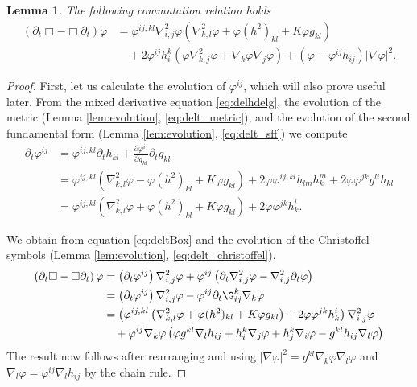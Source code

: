 \documentclass{amsart}
\newtheorem{lemma}[theorem]{Lemma}
\theoremstyle{definition}
\theoremstyle{remark}
\numberwithin{equation}{section}
\begin{document}
\begin{lemma}
\label{lem:deltBox}
The following commutation relation holds
\[
\begin{split}
(\partial_{t}\Box - \Box\partial_{t}) \varphi &= \varphi^{ij,kl} \nabla^2_{i,j} \varphi (\nabla^2_{k,l} \varphi + \varphi (h^2)_{kl} + K \varphi g_{kl}) \\
&\quad + 2\varphi^{ij}h^{k}_{i} (\varphi \nabla^2_{k,j} \varphi + \nabla_k \varphi \nabla_j \varphi) + (\varphi - \varphi^{ij}h_{ij})| \nabla\varphi|^{2}.
\end{split}
\]
\end{lemma}

\begin{proof}
First, let us calculate the evolution of \(\varphi^{ij}\), which will also prove useful later. From the mixed derivative equation \eqref{eq:delhdelg}, the evolution of the metric (Lemma \ref{lem:evolution}, \eqref{eq:delt_metric}), and the evolution of the second fundamental form (Lemma \ref{lem:evolution}, \eqref{eq:delt_sff}) we compute
\begin{equation}
\label{eq:deltBox}
\begin{split}
\partial_{t} \varphi^{ij} &= \varphi^{ij,kl} \partial_t h_{kl} + \frac{\partial\varphi^{ij}}{\partial g_{kl}} \partial_t g_{kl} \\
&= \varphi^{ij,kl} \left(\nabla^2_{k,l} \varphi - \varphi(h^2)_{kl} + K \varphi g_{kl}\right) + 2\varphi \varphi^{ij,kl} h_{lm}h^{m}_{k} + 2\varphi\varphi^{jk}g^{li}h_{kl} \\
&=\varphi^{ij,kl} \left(\nabla^2_{k,l} \varphi + \varphi(h^2)_{kl} + K \varphi g_{kl}\right) + 2\varphi\varphi^{jk}h^{i}_{k}.
\end{split}
\end{equation}

We obtain from equation \eqref{eq:deltBox} and the evolution of the Christoffel symbols (Lemma \ref{lem:evolution}, \eqref{eq:delt_christoffel}),
\[
\begin{split}
\left(\partial_{t}\Box - \Box\partial_{t}\right) \varphi &= \left(\partial_{t}\varphi^{ij}\right) \nabla^2_{i,j} \varphi + \varphi^{ij} \left(\partial_{t} \nabla^2_{i,j} \varphi - \nabla^2_{i,j} \partial_t \varphi\right) \\
&= \left(\partial_{t}\varphi^{ij}\right) \nabla^2_{i,j} \varphi - \varphi^{ij}\partial_t \G^{k}_{ij} \nabla_k \varphi \\
&= \left(\varphi^{ij,kl} \left(\nabla^2_{k,l} \varphi + \varphi(h^2)_{kl} + K \varphi g_{kl}\right) + 2\varphi\varphi^{jk}h^{i}_{k}\right) \nabla^2_{i,j} \varphi \\
&\quad + \varphi^{ij} \nabla_k \varphi \left(\varphi g^{kl} \nabla_l h_{ij} + h^k_i \nabla_j \varphi + h^k_j \nabla_i \varphi - g^{kl} h_{ij} \nabla_l \varphi\right)
\end{split}
\]
The result now follows after rearranging and using \(|\nabla \varphi|^2 = g^{kl}\nabla_k \varphi \nabla_l \varphi\) and \(\nabla_l \varphi = \varphi^{ij} \nabla_l h_{ij}\) by the chain rule.
\end{proof}
\end{document}

